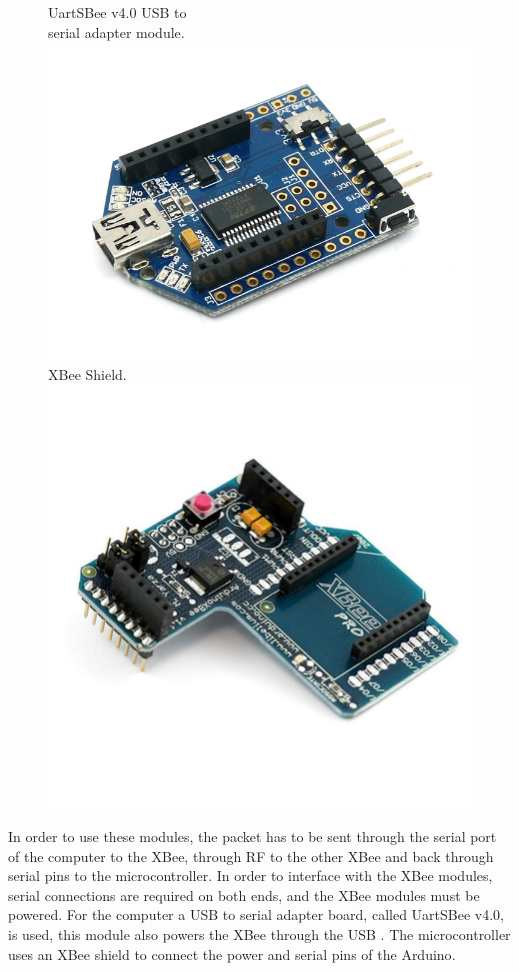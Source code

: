 \begin{figure}[H]
  \centering
  \captionbox
  {
    UartSBee v4.0 USB to\\ serial adapter module. \cite{UartSBee}
    \label{fig:UartSBee}
  }
  {
    \includegraphics[width=.37\textwidth]{figures/UartSBee}
  }
  \hspace{5pt}
  \captionbox
  {
    XBee Shield. \cite{XBeeShield}
    \label{fig:XbeeShield}
  }
  {
    \includegraphics[width=.37\textwidth]{figures/XbeeShield}
  }
\end{figure}
%
In order to use these modules, the packet has to be sent through the serial port of the computer to the XBee, through RF to the other XBee and back through serial pins to the microcontroller. In order to interface with the XBee modules, serial connections are required on both ends, and the XBee modules must be powered. For the computer a USB to serial adapter board, called UartSBee v4.0, is used, this module also powers the XBee through the USB \cite{UartSBeeSch}. The microcontroller uses an XBee shield to connect the power and serial pins of the Arduino\cite{XbeeShieldSch}.